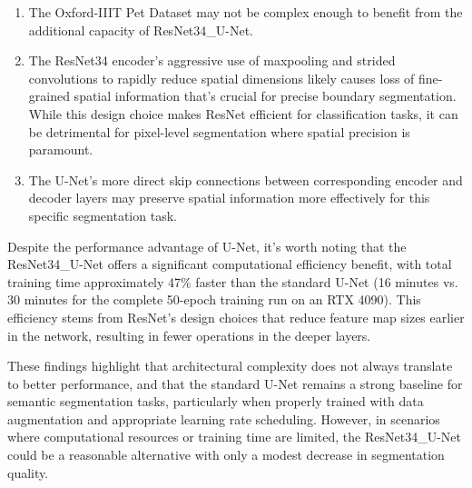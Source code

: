 \documentclass[twocolumn,a4paper]{article}
\begin{document}
\begin{enumerate}
\item The Oxford-IIIT Pet Dataset may not be complex enough to benefit from the additional capacity of ResNet34\_U-Net.
\item The ResNet34 encoder's aggressive use of maxpooling and strided convolutions to rapidly reduce spatial dimensions likely causes loss of fine-grained spatial information that's crucial for precise boundary segmentation. While this design choice makes ResNet efficient for classification tasks, it can be detrimental for pixel-level segmentation where spatial precision is paramount.
\item The U-Net's more direct skip connections between corresponding encoder and decoder layers may preserve spatial information more effectively for this specific segmentation task.
\end{enumerate}

Despite the performance advantage of U-Net, it's worth noting that the ResNet34\_U-Net offers a significant computational efficiency benefit, with total training time approximately 47\% faster than the standard U-Net (16 minutes vs. 30 minutes for the complete 50-epoch training run on an RTX 4090). This efficiency stems from ResNet's design choices that reduce feature map sizes earlier in the network, resulting in fewer operations in the deeper layers.

These findings highlight that architectural complexity does not always translate to better performance, and that the standard U-Net remains a strong baseline for semantic segmentation tasks, particularly when properly trained with data augmentation and appropriate learning rate scheduling. However, in scenarios where computational resources or training time are limited, the ResNet34\_U-Net could be a reasonable alternative with only a modest decrease in segmentation quality.
\end{document}
